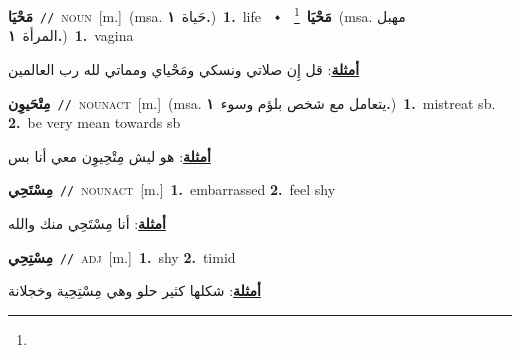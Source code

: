 \documentclass[10pt,a4paper,twoside]{article} %
\begin{document}
\begin{multicols}{2}
{\setlength\topsep{0pt}\textbf{\foreignlanguage{arabic}{مَحْيَا}}\ {\color{gray}\texttt{//}\color{black}}\ \textsc{noun}\ [m.]\ \color{gray}(msa. \foreignlanguage{arabic}{حَياة}~\foreignlanguage{arabic}{\textbf{١.}})\color{black}\ \textbf{1.}~life\ \ $\smblkdiamond$\ \ \setlength\topsep{0pt}\textbf{\foreignlanguage{arabic}{مَحْيَا}}\ \footnote{}\ \color{gray}(msa. \foreignlanguage{arabic}{مهبل المرأة}~\foreignlanguage{arabic}{\textbf{١.}})\color{black}\ \textbf{1.}~vagina\  \begin{flushright}\color{gray}\foreignlanguage{arabic}{\textbf{\underline{\foreignlanguage{arabic}{أمثلة}}}: قل إِن صلاتي ونسكي ومَحْياي ومماتي لله رب العالمين}\end{flushright}\color{black}} \vspace{2mm}

{\setlength\topsep{0pt}\textbf{\foreignlanguage{arabic}{مِتْحَيوِن}}\ {\color{gray}\texttt{//}\color{black}}\ \textsc{noun\textunderscore act}\ [m.]\ \color{gray}(msa. \foreignlanguage{arabic}{يتعامل مع شخص بلؤم وسوء}~\foreignlanguage{arabic}{\textbf{١.}})\color{black}\ \textbf{1.}~mistreat sb.  \textbf{2.}~be very mean towards sb\  \begin{flushright}\color{gray}\foreignlanguage{arabic}{\textbf{\underline{\foreignlanguage{arabic}{أمثلة}}}: هو ليش مِتْحِيوِن معي أنا بس}\end{flushright}\color{black}} \vspace{2mm}

{\setlength\topsep{0pt}\textbf{\foreignlanguage{arabic}{مِسْتَحِي}}\ {\color{gray}\texttt{//}\color{black}}\ \textsc{noun\textunderscore act}\ [m.]\ \textbf{1.}~embarrassed  \textbf{2.}~feel shy\  \begin{flushright}\color{gray}\foreignlanguage{arabic}{\textbf{\underline{\foreignlanguage{arabic}{أمثلة}}}: أنا مِسْتَحِي منك والله}\end{flushright}\color{black}} \vspace{2mm}

{\setlength\topsep{0pt}\textbf{\foreignlanguage{arabic}{مِسْتِحِي}}\ {\color{gray}\texttt{//}\color{black}}\ \textsc{adj}\ [m.]\ \textbf{1.}~shy  \textbf{2.}~timid\  \begin{flushright}\color{gray}\foreignlanguage{arabic}{\textbf{\underline{\foreignlanguage{arabic}{أمثلة}}}: شكلها كثير حلو وهي مِسْتِحِية وخجلانة}\end{flushright}\color{black}} \vspace{2mm}


\end{multicols}
\end{document}
